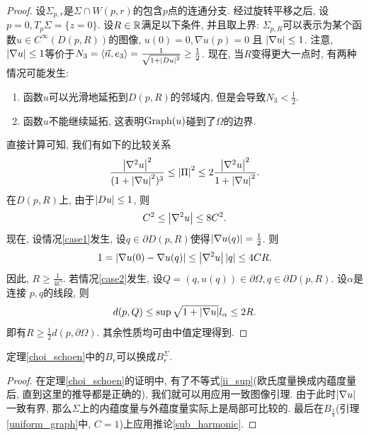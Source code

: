 \begin{proof}
    设$\Sigma_{p,r}$是$\Sigma \cap W(p,r)$的包含$p$点的连通分支.  经过旋转平移之后, 设$p =0, T_p\Sigma = \{z=0\}$. 设$R \in \mathbb{R}$满足以下条件, 并且取上界: $\Sigma_{p,R}$可以表示为某个函数$u \in C^\infty(D(p,R))$的图像, $u(0)=0, \nabla u(p)=0$ 且 $\left | \nabla u \right | \le 1$. 注意, $\left | \nabla u \right | \le 1$等价于$N_3={\left < \vec{n}, e_3 \right >}=\frac{1}{\sqrt{1+\left | Du \right |^2}} \ge \frac{1}{2}$. 现在, 当$R$变得更大一点时, 有两种情况可能发生:
    \begin{enumerate}
        \item 函数$u$可以光滑地延拓到$D(p,R)$的邻域内, 但是会导致$N_3< \frac{1}{2}$. \label{case1}
        \item 函数$u$不能继续延拓, 这表明$\text{Graph}(u)$碰到了$\Omega$的边界. \label{case2}
    \end{enumerate}
    直接计算可知, 我们有如下的比较关系
    \begin{equation}
        \frac{\left | \nabla^2 u \right |^2}{(1+\left | \nabla u \right |^2)^3} \le \left | {\Pi} \right |^2 \le 2 \frac{\left | \nabla^2 u \right |^2}{1+\left | \nabla u \right |^2}.
    \end{equation}
    在$D(p,R)$上, 由于$\left | Du \right | \le 1$, 则
    \begin{equation}
        C^2 \le \left | \nabla^2 u \right | \le 8C^2.
    \end{equation}
    现在, 设情况\eqref{case1}发生, 设$q \in \partial D(p,R)$使得$\left | \nabla u(q) \right |=\frac{1}{2}$. 则
    \begin{equation}
        1=\left | \nabla u(0)-\nabla u(q) \right | \le \left | \nabla^2 u \right |\left | q \right |\le 4CR.
    \end{equation}
    因此, $R \ge \frac{1}{4C}$.
    若情况\eqref{case2}发生,  设$Q=(q,u(q))\in \partial \Omega, q \in \partial D(p,R)$. 设$\alpha$是连接 $p,q$的线段, 则
    \begin{equation}
        d(p,Q) \le \sup \sqrt{1+\left | \nabla u \right |}l_\alpha \le 2R.
    \end{equation}
    即有$R \ge \frac{1}{2}{d(p,\partial \Omega)}$.  其余性质均可由中值定理得到.
\end{proof}
\begin{corollary} \label{choi_schoen_intrinsic}
    定理\eqref{choi_schoen}中的$B_r$可以换成$B^\Sigma_r$.
\end{corollary}
\begin{proof}
    在定理\eqref{choi_schoen}的证明中, 有了不等式\eqref{ii_sup}(欧氏度量换成内蕴度量后, 直到这里的推导都是正确的), 我们就可以用应用一致图像引理. 由于此时$\left | \nabla u \right |$一致有界, 那么$\Sigma$上的内蕴度量与外蕴度量实际上是局部可比较的. 最后在$B_\frac{1}{4}$(引理\eqref{uniform_graph}中, $C=1$)上应用推论\eqref{sub_harmonic}.
\end{proof}

